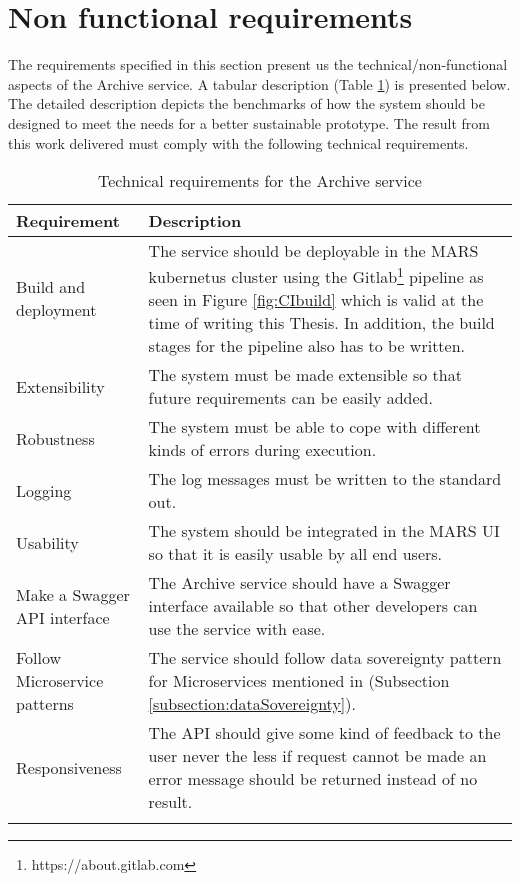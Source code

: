\section{Non functional requirements}
\label{section:technicalReq}
The requirements specified in this section present us the technical/non-functional aspects of the Archive service. A tabular description 
(Table \ref{table: Technical Requirements}) is presented below.
The detailed description depicts the benchmarks of how the system should be designed to meet the needs for a better sustainable prototype.
The result from this work delivered must comply with the following technical requirements.

    \begin{longtable}{|p{3cm}|p{12cm}|}
            \hline
                \textbf{Requirement}  & \textbf{Description}\\
            \hline
                 Build and deployment & 
                 The service should be deployable in the MARS kubernetus \cite{kubernetes} cluster using the Gitlab\footnote{https://about.gitlab.com} pipeline as seen in Figure \ref{fig:CIbuild}
                 which is valid at the time of writing this Thesis. In addition,
                 the build stages for the pipeline also has to be written. \\
            \hline
                 Extensibility & The system must be made extensible so that future requirements can be easily added.\\
            \hline
                 Robustness & The system must be able to cope with different kinds of errors during execution.\\    
            \hline
                 Logging &  The log messages must be written to the standard out.\\    
            \hline
                 Usability & The system should be integrated in the MARS UI so that it is easily usable by all end users.\\     
            \hline
                 Make a Swagger API interface & The Archive service should have a Swagger \cite{swagger} interface available so that other 
                 developers can use the service with ease.\\         
            \hline
                Follow Microservice patterns & The service should follow data sovereignty pattern for Microservices mentioned in 
                (Subsection \ref{subsection:dataSovereignty}).\\ 
            \hline
                Responsiveness & The API should give some kind of feedback to the user never the less if request cannot be made an 
                error message should be returned instead of no result.\\      
            \hline
        \caption{Technical requirements for the Archive service}
        \label{table: Technical Requirements}     
    \end{longtable} 
  
    